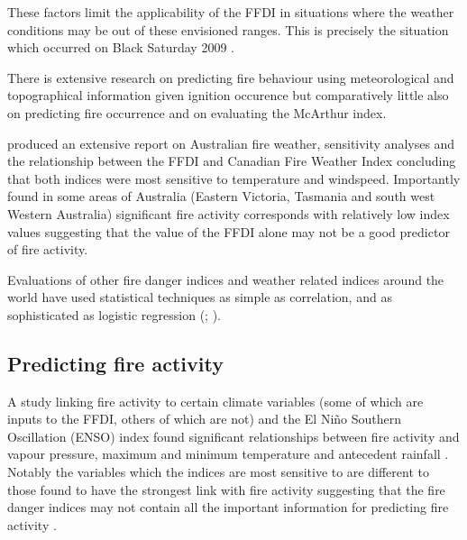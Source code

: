 \documentclass[11pt,a4paper]{article}
\begin{document}
These factors limit the applicability of the FFDI in situations where the weather conditions may be out of these envisioned ranges. This is precisely the situation which occurred on Black Saturday 2009 \citep{harris12}. 

There is extensive research on predicting fire behaviour using meteorological and topographical information given ignition occurence but comparatively little also on  predicting fire occurrence and on evaluating the McArthur index. 

\citet{dowdy10} produced an extensive report on Australian fire weather, sensitivity analyses and the relationship between the FFDI and Canadian Fire Weather Index concluding that both indices were most sensitive to temperature and windspeed. Importantly \citet{dowdy10} found in some areas of Australia (Eastern Victoria, Tasmania and south west Western Australia) significant fire activity corresponds with relatively low index values suggesting that the value of the FFDI alone may not be a good predictor of fire activity. 

Evaluations of other fire danger indices and weather related indices around the world have used statistical techniques as simple as correlation, and as sophisticated as logistic regression (\cite{andrews03}; \cite{harris14}). 


\subsection{Predicting fire activity}
A study linking fire activity to certain climate variables (some of which are inputs to the FFDI, others of which are not) and the El Niño Southern Oscillation (ENSO) index found significant relationships between fire activity and vapour pressure, maximum and minimum temperature and antecedent rainfall \citep{harris14}. Notably the variables which the indices are most sensitive to are different to those found to have the strongest link with fire activity suggesting that the fire danger indices may not contain all the important information for predicting fire activity \citep{harris14}. 
\end{document}
